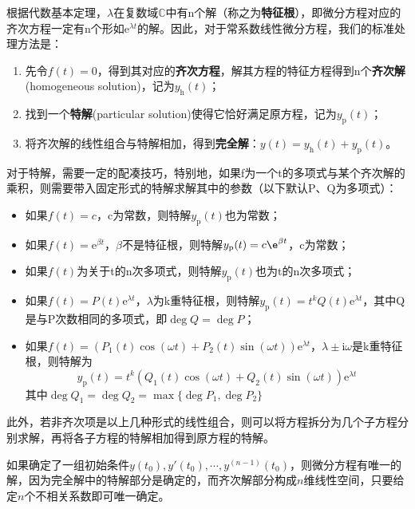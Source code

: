 根据代数基本定理，$\lambda$在复数域$\mathbb{C}$中有n个解（称之为\textbf{特征根}），即微分方程对应的齐次方程一定有n个形如$\mathrm{e}^{\lambda t}$的解。因此，对于常系数线性微分方程，我们的标准处理方法是：
\begin{enumerate}
    \item 先令$f(t)=0$，得到其对应的\textbf{齐次方程}，解其方程的特征方程得到n个\textbf{齐次解}(homogeneous solution)，记为$y_{\text{h}}(t)$；
    \item 找到一个\textbf{特解}(particular solution)使得它恰好满足原方程，记为$y_{\text{p}}(t)$；
    \item 将齐次解的线性组合与特解相加，得到\textbf{完全解}：$y(t)=y_{\text{h}}(t)+y_{\text{p}}(t)$。
\end{enumerate}
对于特解，需要一定的配凑技巧，特别地，如果f为一个t的多项式与某个齐次解的乘积，则需要带入固定形式的特解求解其中的参数（以下默认P、Q为多项式）：\begin{itemize}
    \item 如果$f(t)=c$，c为常数，则特解$y_{\text{p}}(t)$也为常数；
    \item 如果$f(t)=\mathrm{e}^{\beta t}$，$\beta$不是特征根，则特解$y_{\text{p}}(t)=c\e^{\beta t}$，c为常数；
    \item 如果$f(t)$为关于t的n次多项式，则特解$y_{\text{p}}(t)$也为t的n次多项式；
    \item 如果$f(t)=P(t)\mathrm{e}^{\lambda t}$，$\lambda$为k重特征根，则特解$y_{\text{p}}(t)=t^k Q(t)\mathrm{e}^{\lambda t}$，其中Q是与P次数相同的多项式，即$\deg Q=\deg P$；
    \item 如果$f(t)=(P_1(t)\cos(\omega t)+P_2(t)\sin(\omega t))\mathrm{e}^{\lambda t}$，$\lambda\pm \mathrm{i}\omega$是k重特征根，则特解为
    $$y_{\text{p}}(t)=t^k(Q_1(t)\cos(\omega t)+Q_2(t)\sin(\omega t))\mathrm{e}^{\lambda t}$$
    其中$\deg Q_1=\deg Q_2=\max\{\deg P_1,\deg P_2\}$
\end{itemize}
此外，若非齐次项是以上几种形式的线性组合，则可以将方程拆分为几个子方程分别求解，再将各子方程的特解相加得到原方程的特解。

如果确定了一组初始条件$y(t_0),y'(t_0),\cdots,y^{(n-1)}(t_0)$，则微分方程有唯一的解，因为完全解中的特解部分是确定的，而齐次解部分构成$n$维线性空间，只要给定$n$个不相关系数即可唯一确定。

